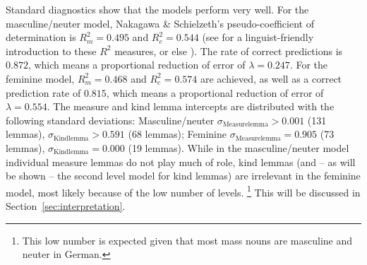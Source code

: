 \documentclass[USenglish]{article}
\begin{document}

Standard diagnostics show that the models perform very well.
For the masculine\slash neuter model, Nakagawa \& Schielzeth's pseudo-coefficient of determination is $R_m^2=0.495$ and $R^2_c=0.544$ (see \citealp{Gries2015} for a linguist-friendly introduction to these $R^2$ measures, or else \citealp{NakagawaSchielzeth2013}).
The rate of correct predictions is $0.872$, which means a proportional reduction of error of $\lambda=0.247$.
For the feminine model, $R_m^2=0.468$ and $R^2_c=0.574$ are achieved, as well as a correct prediction rate of $0.815$, which means a proportional reduction of error of $\lambda=0.554$.
The measure and kind lemma intercepts are distributed with the following standard deviations:
Masculine\slash neuter $\sigma_{\text{Measurelemma}}>0.001$ (131 lemmas), $\sigma_{\text{Kindlemma}}>0.591$ (68 lemmas);
Feminine $\sigma_{\text{Measurelemma}}=0.905$ (73 lemmas), $\sigma_{\text{Kindlemma}}=0.000$ (19 lemmas).
While in the masculine\slash neuter model individual measure lemmas do not play much of role, kind lemmas (and -- as will be shown -- the second level model for kind lemmas) are irrelevant in the feminine model, most likely because of the low number of levels.%
\footnote{This low number is expected given that most mass nouns are masculine and neuter in German.}
This will be discussed in Section~\ref{sec:interpretation}.
\end{document}
